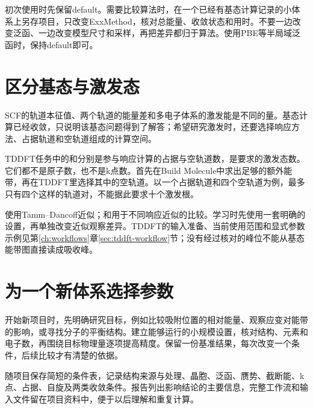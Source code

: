 初次使用时先保留default。需要比较算法时，在一个已经有基态计算记录的小体系上另存项目，只改变ExxMethod，核对总能量、收敛状态和用时。不要一边改变泛函、一边改变模型尺寸和采样，再把差异都归于算法。使用PBE等半局域泛函时，保持default即可。

\section{区分基态与激发态}

SCF的轨道本征值、两个轨道的能量差和多电子体系的激发能是不同的量。基态计算已经收敛，只说明该基态问题得到了解答；希望研究激发时，还要选择响应方法、占据轨道和空轨道组成的计算空间。

TDDFT任务中的和分别是参与响应计算的占据与空轨道数，是要求的激发态数。它们都不是原子数，也不是k点数。首先在Build Molecule中求出足够的额外能带，再在TDDFT里选择其中的空轨道。以一个占据轨道和四个空轨道为例，最多只有四个这样的轨道对，不能据此要求十个激发根。

使用Tamm--Dancoff近似；和用于不同响应近似的比较。学习时先使用一套明确的设置，再单独改变近似观察差异。TDDFT的输入准备、当前使用范围和显式参数示例见第\ref{ch:workflows}章\ref{sec:tddft-workflow}节；没有经过核对的峰位不能从基态能带图直接读成吸收峰。


\section{为一个新体系选择参数}

开始新项目时，先明确研究目标，例如比较吸附位置的相对能量、观察应变对能带的影响，或寻找分子的平衡结构。建立能够运行的小规模设置，核对结构、元素和电子数，再围绕目标物理量逐项提高精度。保留一份基准结果，每次改变一个条件，后续比较才有清楚的依据。

随项目保存简短的条件表，记录结构来源与处理、晶胞、泛函、赝势、截断能、k点、占据、自旋及两类收敛条件。报告列出影响结论的主要信息，完整工作流和输入文件留在项目资料中，便于以后理解和重复计算。
